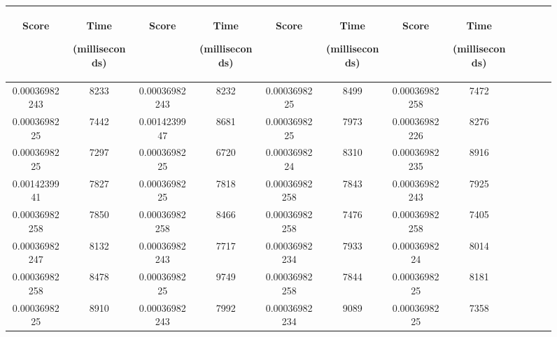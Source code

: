 \begin{figure}[h]
  \centering
  \begin{tabular}{|c|c|c|c|c|c|c|c|c|c|c|c|} 
  \midrule
 \begin{sideways}Score\end{sideways}& \begin{sideways}Time\end{sideways} \begin{sideways} (milliseconds)\end{sideways}& \begin{sideways}Score\end{sideways}& \begin{sideways}Time\end{sideways}  \begin{sideways}(milliseconds)\end{sideways}& \begin{sideways}Score\end{sideways}& \begin{sideways}Time\end{sideways}  \begin{sideways}(milliseconds)\end{sideways}& \begin{sideways}Score\end{sideways}& \begin{sideways}Time\end{sideways}  \begin{sideways} (milliseconds)\end{sideways}\\
\midrule
0.00036982243&8233&0.00036982243&8232&0.0003698225&8499&0.00036982258&7472\\
\midrule
0.0003698225&7442&0.0014239947&8681&0.0003698225&7973&0.00036982226&8276\\
\midrule
0.0003698225&7297&0.0003698225&6720&0.0003698224&8310&0.00036982235&8916\\
\midrule
0.0014239941&7827&0.0003698225&7818&0.00036982258&7843&0.00036982243&7925\\
\midrule
0.00036982258&7850&0.00036982258&8466&0.00036982258&7476&0.00036982258&7405\\
\midrule
0.00036982247&8132&0.00036982243&7717&0.00036982234&7933&0.0003698224&8014\\
\midrule
0.00036982258&8478&0.0003698225&9749&0.00036982258&7844&0.0003698225&8181\\
\midrule
0.0003698225&8910&0.00036982243&7992&0.00036982234&9089&0.0003698225&7358\\

\end{tabular}
\end{figure}
